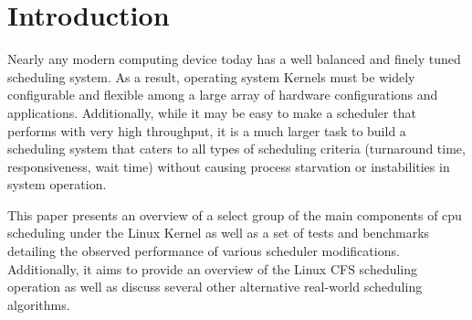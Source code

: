 \section{Introduction}
	Nearly any modern computing device today has a well balanced and finely tuned scheduling system. As a result, operating system Kernels must be widely configurable and flexible among a large array of hardware configurations and applications. Additionally, while it may be easy to make a scheduler that performs with very high throughput, it is a much larger task to build a scheduling system that caters to all types of scheduling criteria (turnaround time, responsiveness, wait time) without causing process starvation or instabilities in system operation.
	
	This paper presents an overview of a select group of the main components of cpu scheduling under the Linux Kernel as well as a set of tests and benchmarks detailing the observed performance of various scheduler modifications. Additionally, it aims to provide an overview of the Linux CFS scheduling operation as well as discuss several other alternative real-world scheduling algorithms.
